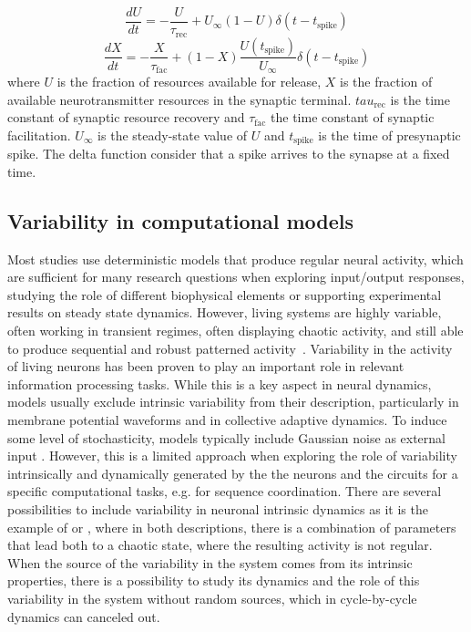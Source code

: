 \begin{equation}
	\frac{dU}{dt} = -\frac{U}{\tau_{\text{rec}}} + U_{\infty}(1 - U) \delta(t - t_{\text{spike}})
	\label{eq:tsodyks1}
\end{equation}
\begin{equation}
	\frac{dX}{dt} = -\frac{X}{\tau_{\text{fac}}} + (1 - X) \frac{U(t_{\text{spike}})}{U_{\infty}} \delta(t - t_{\text{spike}})
	\label{eq:tsodyks2}
\end{equation}
\noindent where $U$ is the fraction of resources available for release, $X$ is the fraction of available neurotransmitter resources in the synaptic terminal. $tau_\text{rec}$ is the time constant of synaptic resource recovery and $\tau_\text{fac}$ the time constant of synaptic facilitation. $U_\infty$ is the steady-state value of $U$ and $t_{\text{spike}}$ is the time of presynaptic spike. The delta function consider that a spike arrives to the synapse at a fixed time. 


\subsection{Variability in computational models}

Most studies use deterministic models that produce regular neural activity, which are sufficient for many research questions when exploring input/output responses, studying the role of different biophysical elements or supporting experimental results on steady state dynamics. However, living systems are highly variable, often working in transient regimes, often displaying chaotic activity, and still able to produce sequential and robust patterned activity~\parencite{selverston_reliable_2000}. Variability in the activity of living neurons has been proven to play an important role in relevant information processing tasks\parencite{ding_phd_dynamic_2011,renart_variability_2014,masquelier_neural_2013,hutt_intrinsic_2023,ribeiro_trial-by-trial_2024}. While this is a key aspect in neural dynamics, models usually exclude intrinsic variability from their description,  particularly in membrane potential waveforms and in collective adaptive dynamics. To induce some level of stochasticity, models typically include Gaussian noise as external input \parencite{linaro_accurate_2011,pezo_diffusion_2014,zheng_spontaneous_2020}. However, this is a limited approach when exploring the role of variability intrinsically and dynamically generated by the the neurons and the circuits for a specific computational tasks, e.g. for sequence coordination. There are several possibilities to include variability in neuronal intrinsic dynamics as it is the example of \cite{hindmarsh_model_1984} or \cite{komendantov_deterministic_1996}, where in both descriptions, there is a combination of parameters that lead both to a chaotic state, where the resulting activity is not regular. When the source of the variability in the system comes from its intrinsic properties, there is a possibility to study its dynamics and the role of this variability in the system without random sources, which in cycle-by-cycle dynamics can canceled out.

